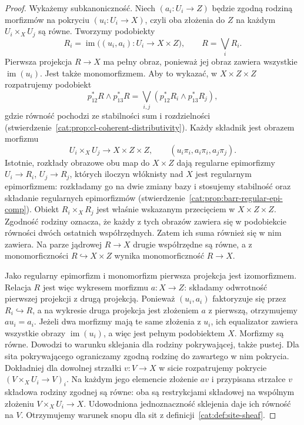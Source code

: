 \begin{proof}
Wykażemy subkanoniczność. Niech $(a_i:U_i\to Z)$ będzie zgodną rodziną morfizmów na pokryciu $(u_i:U_i\to X)$, czyli oba złożenia do $Z$ na każdym $U_i\times_X U_j$ są równe. Tworzymy podobiekty
\[
 R_i=\operatorname{im}\bigl((u_i,a_i):U_i\to X\times Z\bigr),
 \qquad R=\bigvee_iR_i.
\]
Pierwsza projekcja $R\to X$ ma pełny obraz, ponieważ jej obraz zawiera wszystkie $\operatorname{im}(u_i)$. Jest także monomorfizmem. Aby to wykazać, w $X\times Z\times Z$ rozpatrujemy podobiekt
\[
 p_{12}^*R\wedge p_{13}^*R
 =\bigvee_{i,j}(p_{12}^*R_i\wedge p_{13}^*R_j),
\]
gdzie równość pochodzi ze stabilności sum i rozdzielności (stwierdzenie~\ref{cat:prop:cl-coherent-distributivity}). Każdy składnik jest obrazem morfizmu
\[
 U_i\times_X U_j\longrightarrow X\times Z\times Z,\qquad
 (u_i\pi_i,a_i\pi_i,a_j\pi_j).
\]
Istotnie, rozkłady obrazowe obu map do $X\times Z$ dają regularne epimorfizmy $U_i\to R_i$, $U_j\to R_j$, których iloczyn włóknisty nad $X$ jest regularnym epimorfizmem: rozkładamy go na dwie zmiany bazy i stosujemy stabilność oraz składanie regularnych epimorfizmów (stwierdzenie~\ref{cat:prop:barr-regular-epi-comp}). Obiekt $R_i\times_X R_j$ jest właśnie wskazanym przecięciem w $X\times Z\times Z$. Zgodność rodziny oznacza, że każdy z tych obrazów zawiera się w podobiekcie równości dwóch ostatnich współrzędnych. Zatem ich suma również się w nim zawiera. Na parze jądrowej $R\to X$ drugie współrzędne są równe, a z monomorficzności $R\hookrightarrow X\times Z$ wynika monomorficzność $R\to X$.

Jako regularny epimorfizm i monomorfizm pierwsza projekcja jest izomorfizmem. Relacja $R$ jest więc wykresem morfizmu $a:X\to Z$: składamy odwrotność pierwszej projekcji z drugą projekcją. Ponieważ $(u_i,a_i)$ faktoryzuje się przez $R_i\hookrightarrow R$, a na wykresie druga projekcja jest złożeniem $a$ z pierwszą, otrzymujemy $au_i=a_i$. Jeżeli dwa morfizmy mają te same złożenia z $u_i$, ich equalizator zawiera wszystkie obrazy $\operatorname{im}(u_i)$, a więc jest pełnym podobiektem $X$. Morfizmy są równe. Dowodzi to warunku sklejania dla rodziny pokrywającej, także pustej. Dla sita pokrywającego ograniczamy zgodną rodzinę do zawartego w nim pokrycia. Dokładniej dla dowolnej strzałki $v:V\to X$ w sicie rozpatrujemy pokrycie $(V\times_X U_i\to V)_i$. Na każdym jego elemencie złożenie $av$ i przypisana strzałce $v$ składowa rodziny zgodnej są równe: oba są restrykcjami składowej na wspólnym złożeniu $V\times_X U_i\to X$. Udowodniona jednoznaczność sklejenia daje ich równość na $V$. Otrzymujemy warunek snopu dla sit z definicji~\ref{cat:def:site-sheaf}.
\end{proof}

